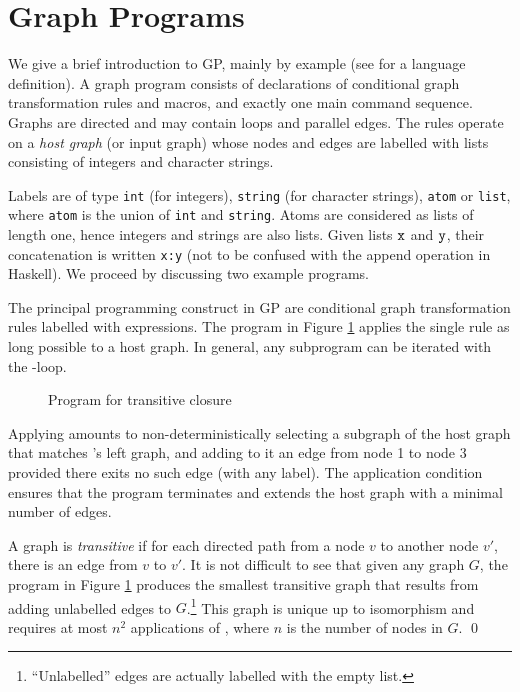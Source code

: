 \section{Graph Programs}
\label{sec:graph-programs}

We give a brief introduction to GP, mainly by example (see \cite{Plump12a} for a language definition). A graph program consists of declarations of conditional graph transformation rules and macros, and exactly one main command sequence. Graphs are directed and may contain  loops and parallel edges. The rules operate on a \emph{host graph}\/ (or input graph) whose nodes and edges are labelled with lists consisting of integers and character strings.

Labels are of type \texttt{int} (for integers), \texttt{string} (for character strings), \texttt{atom} or \texttt{list}, where \texttt{atom} is the union of \texttt{int} and \texttt{string}. Atoms are considered as lists of length one, hence integers and strings are also lists. Given lists $\mathtt{x}$ and $\mathtt{y}$, their concatenation is written \texttt{x:y} (not to be confused with the append operation in Haskell). 
We proceed by discussing two example programs.

\begin{example}
The principal programming construct in GP are conditional graph transformation rules labelled with expressions. The program in Figure \ref{fig:transitive-closure} applies the single rule  as long possible to a host graph. In general, any subprogram can be iterated with the \ttt{!}-loop.

\begin{figure}[htb]
\begin{center}
 
\end{center}
\caption{Program for transitive closure}\label{fig:transitive-closure}
\end{figure}

Applying  amounts to non-deterministically selecting a subgraph of the host graph that matches 's left graph, and adding to it an edge from node 1 to node 3 provided there exits no such edge (with any label). The application condition ensures that the program terminates and extends the host graph with a minimal number of edges.

A graph is \emph{transitive} if for each directed path from a node $v$ to another node $v'$, there is an edge from $v$ to $v'$. It is not difficult to see that given any graph $G$, the program in Figure \ref{fig:transitive-closure} produces the smallest transitive graph that results from adding unlabelled edges to $G$.\footnote{``Unlabelled'' edges are actually labelled with the empty list.} This graph is unique up to isomorphism and requires at most $n^2$ applications of , where $n$\/ is the number of nodes in $G$. \qed
\end{example}
  

